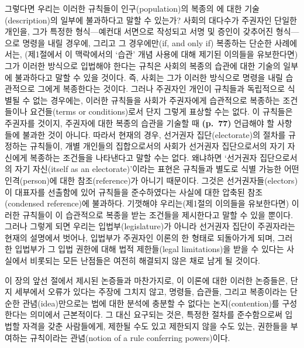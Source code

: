 그렇다면 우리는 이러한 규칙들이 인구(population)의 복종의
에 대한 기술(description)의 일부에 불과하다고 말할 수
있는가? 사회의 대다수가 주권자인 단일한 개인을, 그가 특정한
형식---예컨대 서면으로 작성되고 서명 및 증인이 갖추어진 형식---으로
명령을 내릴 경우에, 그리고 그 경우에만(if, and only if) 복종하는 단순한
사례에서는, (제1절에서 이 맥락에서의 ‘습관’ 개념 사용에 대해 제기된
이의들을 유보한다면) 그가 이러한 방식으로 입법해야 한다는 규칙은 사회의
복종의 습관에 대한 기술의 일부에 불과하다고 말할 수 있을 것이다. 즉,
사회는 그가 이러한 방식으로 명령을 내릴  습관적으로
그에게 복종한다는 것이다. 그러나 주권자인 개인이 규칙들과 독립적으로
식별될 수 없는 경우에는, 이러한 규칙들을 사회가 주권자에게 습관적으로
복종하는 조건들이나 요건들(terms or conditions)로서 단지 그렇게 표상할
수는 없다. 이 규칙들은 주권자를  것이지,
주권자에 대한 복종의 습관을 기술할 때 \textbf{(p.~77)} 언급해야 할
사항들에 불과한 것이 아니다. 따라서 현재의 경우, 선거권자
집단(electorate)의 절차를 규정하는 규칙들이, 개별 개인들의 집합으로서의
사회가 선거권자 집단으로서의 자기 자신에게 복종하는 조건들을 나타낸다고
말할 수는 없다. 왜냐하면 ‘선거권자 집단으로서의 자기 자신(itself as an
electorate)’이라는 표현은 규칙들과 별도로 식별 가능한 어떤
인격(person)에 대한 참조(reference)가 아니기 때문이다. 그것은
선거권자들(electors)이 대표자를 선출함에 있어 규칙들을 준수하였다는
사실에 대한 압축된 참조(condensed reference)에 불과하다. 기껏해야
우리는(제1절의 이의들을 유보한다면) 이러한 규칙들이 이 습관적으로 복종을 받는 조건들을 제시한다고
말할 수 있을 뿐이다. 그러나 그렇게 되면 우리는 입법부(legislature)가
아니라 선거권자 집단이 주권자라는 현재의 설명에서 벗어나, 입법부가
주권자인 이론의 한 형태로 되돌아가게 되며, 그러한 입법부가 그 입법
권한에 대해 법적 제한들(legal limitations)을 받을 수 있다는 사실에서
비롯되는 모든 난점들은 여전히 해결되지 않은 채로 남게 될 것이다.

이 장의 앞선 절에서 제시된 논증들과 마찬가지로, 이 이론에 대한 이러한
논증들은, 단지 세부에서 오류가 있다는 주장에 그치지 않고, 명령들,
습관들, 그리고 복종이라는 단순한 관념(idea)만으로는 법에 대한 분석에
충분할 수 없다는 논지(contention)를 구성한다는 의미에서 근본적이다. 그
대신 요구되는 것은, 특정한 절차를 준수함으로써 입법할 자격을 갖춘
사람들에게, 제한될 수도 있고 제한되지 않을 수도 있는, 권한들을 부여하는
규칙이라는 관념(notion of a rule conferring powers)이다.

